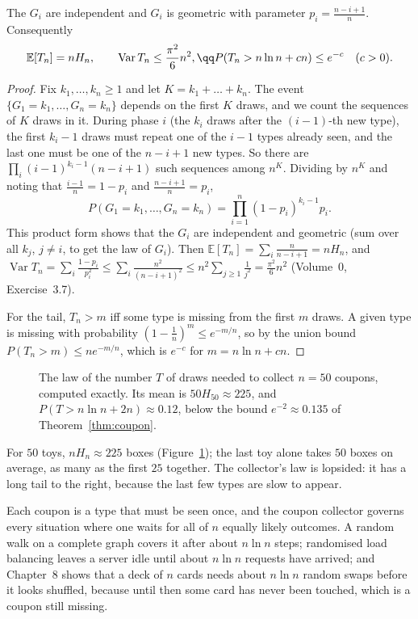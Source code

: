 \begin{theorem}\label{thm:coupon}
The $G_i$ are independent and $G_i$ is geometric with parameter $p_i=\frac{n-i+1}n$. Consequently
\[
\begin{gathered}\mathbb E[T_n]=nH_n,\qquad\operatorname{Var}T_n\le\frac{\pi^2}6n^2,\qq P(T_n>n\ln n+cn)\le e^{-c}\quad(c>0).\end{gathered}
\]
\end{theorem}
\begin{proof}
Fix $k_1,\dots,k_n\ge1$ and let $K=k_1+\dots+k_n$. The event $\{G_1=k_1,\dots,G_n=k_n\}$ depends on the first $K$ draws,
and we count the sequences of $K$ draws in it. During phase $i$ (the $k_i$ draws after the $(i-1)$-th new type),
the first $k_i-1$ draws must repeat one of the $i-1$ types already seen, and the last one must be one of the
$n-i+1$ new types. So there are $\prod_i(i-1)^{k_i-1}(n-i+1)$ such sequences among $n^K$. Dividing by $n^K$ and noting that
$\frac{i-1}n=1-p_i$ and $\frac{n-i+1}n=p_i$,
\[
P(G_1=k_1,\dots,G_n=k_n)=\prod_{i=1}^n(1-p_i)^{k_i-1}p_i.
\]
This product form shows that the $G_i$ are independent and geometric (sum over all $k_j$, $j\ne i$, to get the law
of $G_i$). Then $\mathbb E[T_n]=\sum_i\frac n{n-i+1}=nH_n$, and $\operatorname{Var}T_n=\sum_i\frac{1-p_i}{p_i^2}\le\sum_i\frac{n^2}{(n-i+1)^2}\le
n^2\sum_{j\ge1}\frac1{j^2}=\frac{\pi^2}6n^2$ (Volume~0, Exercise~3.7).

For the tail, $T_n>m$ iff some type is missing from the first $m$ draws. A given type is missing with probability
$(1-\frac1n)^m\le e^{-m/n}$, so by the union bound $P(T_n>m)\le ne^{-m/n}$, which is $e^{-c}$ for $m=n\ln n+cn$.
\end{proof}

\begin{figure}[ht]
\centering
{}
\caption{The law of the number $T$ of draws needed to collect $n=50$ coupons, computed exactly. Its mean is
$50H_{50}\approx225$, and $P(T>n\ln n+2n)\approx0.12$, below the bound $e^{-2}\approx0.135$ of Theorem~\ref{thm:coupon}.}
\label{fig:coupon}
\end{figure}

For $50$ toys, $nH_n\approx225$ boxes (Figure~\ref{fig:coupon}); the last toy alone takes $50$ boxes on average, as
many as the first $25$ together. The collector's law is lopsided: it has a long tail to the right, because the last
few types are slow to appear.

\begin{beauty}
Each coupon is a type that must be seen once, and the coupon collector governs every situation where one waits for
all of $n$ equally likely outcomes. A random walk on a complete graph covers it after about $n\ln n$ steps;
randomised load balancing leaves a server idle until about $n\ln n$ requests have arrived; and Chapter~8 shows that
a deck of $n$ cards needs about $n\ln n$ random swaps before it looks shuffled, because until then some card has never
been touched, which is a coupon still missing.
\end{beauty}

